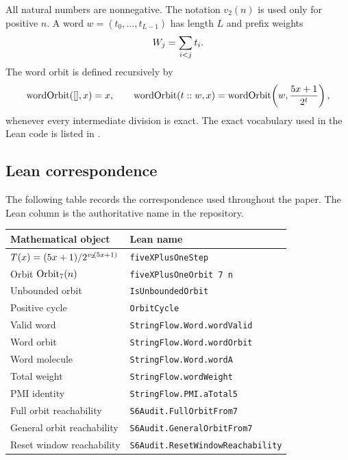 All natural numbers are nonnegative.  The notation $v_2(n)$ is used only
for positive $n$.  A word $w=(t_0,\dots,t_{L-1})$ has length $L$ and
prefix weights
\begin{equation*}
  W_j=\sum_{i<j} t_i.
\end{equation*}
The word orbit is defined recursively by
\begin{equation*}
  \mathrm{wordOrbit}([],x)=x,\qquad
  \mathrm{wordOrbit}(t::w,x)=\mathrm{wordOrbit}\!\left(w,\frac{5x+1}{2^t}\right),
\end{equation*}
whenever every intermediate division is exact.  The exact vocabulary
used in the Lean code is listed in .

\subsection{Lean correspondence}

The following table records the correspondence used throughout the
paper.  The Lean column is the authoritative name in the repository.

\begin{center}
\small
\begin{tabular}{p{}p{}}
\toprule
Mathematical object & Lean name \\
\midrule
$T(x)=(5x+1)/2^{v_2\!\left(5x+1\right)}$ & \texttt{fiveXPlusOneStep} \\
Orbit $\mathrm{Orbit}_7(n)$ & \texttt{fiveXPlusOneOrbit 7 n} \\
Unbounded orbit & \texttt{IsUnboundedOrbit} \\
Positive cycle & \texttt{OrbitCycle} \\
Valid word & \texttt{StringFlow.Word.wordValid} \\
Word orbit & \texttt{StringFlow.Word.wordOrbit} \\
Word molecule & \texttt{StringFlow.Word.wordA} \\
Total weight & \texttt{StringFlow.wordWeight} \\
PMI identity & \texttt{StringFlow.PMI.aTotal5} \\
Full orbit reachability & \texttt{S6Audit.FullOrbitFrom7} \\
General orbit reachability & \texttt{S6Audit.GeneralOrbitFrom7} \\
Reset window reachability & \texttt{S6Audit.ResetWindowReachability} \\
\bottomrule
\end{tabular}
\end{center}
